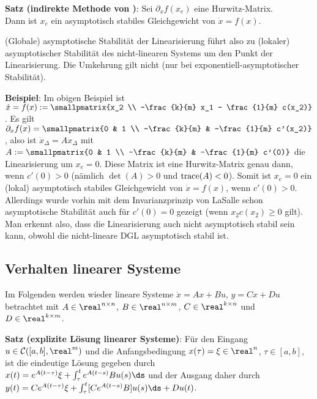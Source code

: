 \textbf{Satz (indirekte Methode von )}:
Sei $\partial_x f(x_e)$ eine Hurwitz-Matrix.\\
Dann ist $x_e$ ein asymptotisch stabiles Gleichgewicht von $\dot{x} = f(x)$.

(Globale) asymptotische Stabilität der Linearisierung führt also zu (lokaler) asymptotischer
Stabilität des nicht-linearen Systems um den Punkt der Linearisierung.
Die Umkehrung gilt nicht
(nur bei exponentiell-asymptotischer Stabilität).

\textbf{Beispiel}:
Im obigen Beispiel ist $\dot{x} = f(x) :=
\smallpmatrix{x_2 \\ -\frac{k}{m} x_1 - \frac{1}{m} c(x_2)}$.
Es gilt
$\partial_x f(x) = \smallpmatrix{0 & 1 \\ -\frac{k}{m} & -\frac{1}{m} c'(x_2)}$,
also ist $\dot{x}_\Delta = Ax_\Delta$ mit
$A := \smallpmatrix{0 & 1 \\ -\frac{k}{m} & -\frac{1}{m} c'(0)}$
die Linearisierung um $x_e = 0$.
Diese Matrix ist eine Hurwitz-Matrix genau dann, wenn $c'(0) > 0$
(nämlich $\det(A) > 0$ und $\operatorname{trace}(A) < 0$).
Somit ist $x_e = 0$ ein (lokal) asymptotisch stabiles Gleichgewicht von $\dot{x} = f(x)$,
wenn $c'(0) > 0$.
Allerdings wurde vorhin mit dem Invarianzprinzip von LaSalle
schon asymptotische Stabilität auch für $c'(0) = 0$ gezeigt (wenn $x_2 c(x_2) \ge 0$ gilt).
Man erkennt also, dass die Linearisierung auch nicht asymptotisch stabil sein kann,
obwohl die nicht-lineare DGL asymptotisch stabil ist.

\pagebreak

\subsection{%
    Verhalten linearer Systeme%
}

Im Folgenden werden wieder lineare Systeme $\dot{x} = Ax + Bu$, $y = Cx + Du$ betrachtet
mit $A \in \real^{n \times n}$, $B \in \real^{n \times m}$, $C \in \real^{k \times n}$ und
$D \in \real^{k \times m}$.

\textbf{Satz (explizite Lösung linearer Systeme)}:
Für den Eingang $u \in \C([a, b], \real^m)$ und die Anfangsbedingung $x(\tau) = \xi \in \real^n$,
$\tau \in [a, b]$, ist die eindeutige Lösung gegeben durch\\
$x(t) = e^{A(t - \tau)} \xi + \int_\tau^t e^{A(t - s)} Bu(s) \ds$
und der Ausgang daher durch\\
$y(t) = Ce^{A(t - \tau)} \xi + \int_\tau^t [Ce^{A(t - s)} B]u(s) \ds + Du(t)$.

